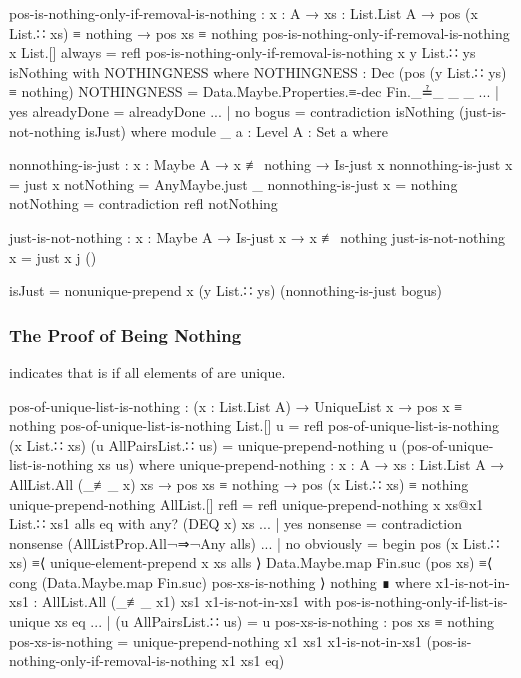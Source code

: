 \documentclass{report}
\begin{document}
\begin{code}
    pos-is-nothing-only-if-removal-is-nothing :
      {x : A} →
      {xs : List.List A} →
      pos (x List.∷ xs) ≡ nothing →
      pos xs ≡ nothing
    pos-is-nothing-only-if-removal-is-nothing {x} {List.[]} always = refl
    pos-is-nothing-only-if-removal-is-nothing {x} {y List.∷ ys} isNothing with NOTHINGNESS
      where
      NOTHINGNESS : Dec (pos (y List.∷ ys) ≡ nothing)
      NOTHINGNESS = Data.Maybe.Properties.≡-dec Fin._≟_ _ _
    ... | yes alreadyDone = alreadyDone
    ... | no bogus = contradiction isNothing (just-is-not-nothing isJust)
      where
      module _
        {a : Level}
        {A : Set a} where

        nonnothing-is-just : {x : Maybe A} → x ≢ nothing → Is-just x
        nonnothing-is-just {x = just x} notNothing = AnyMaybe.just _
        nonnothing-is-just {x = nothing} notNothing = contradiction refl notNothing

        just-is-not-nothing : {x : Maybe A} → Is-just x → x ≢ nothing
        just-is-not-nothing {x = just x} j ()

      isJust = nonunique-prepend x (y List.∷ ys) (nonnothing-is-just bogus)
\end{code}

\subsubsection{The Proof of Being Nothing}
 indicates that   is  if all elements of  are unique.

\begin{code}
    pos-of-unique-list-is-nothing :
      (x : List.List A) →
      UniqueList x →
      pos x ≡ nothing
    pos-of-unique-list-is-nothing List.[] u = refl
    pos-of-unique-list-is-nothing (x List.∷ xs) (u AllPairsList.∷ us) =
      unique-prepend-nothing u (pos-of-unique-list-is-nothing xs us)
      where
      unique-prepend-nothing :
        {x : A} →
        {xs : List.List A} →
        AllList.All (_≢_ x) xs →
        pos xs ≡ nothing →
        pos (x List.∷ xs) ≡ nothing
      unique-prepend-nothing AllList.[] refl = refl
      unique-prepend-nothing {x} xs@{x1 List.∷ xs1} alls eq with any? (DEQ x) xs
      ... | yes nonsense = contradiction nonsense (AllListProp.All¬⇒¬Any alls)
      ... | no obviously = begin
        pos (x List.∷ xs)
          ≡⟨ unique-element-prepend x xs alls ⟩
        Data.Maybe.map Fin.suc (pos xs)
          ≡⟨ cong (Data.Maybe.map Fin.suc) pos-xs-is-nothing ⟩
        nothing ∎
        where
        x1-is-not-in-xs1 : AllList.All (_≢_ x1) xs1
        x1-is-not-in-xs1 with pos-is-nothing-only-if-list-is-unique xs eq
        ... | (u AllPairsList.∷ us) = u
        pos-xs-is-nothing : pos xs ≡ nothing
        pos-xs-is-nothing =
          unique-prepend-nothing {x1} {xs1}
                                 x1-is-not-in-xs1
                                 (pos-is-nothing-only-if-removal-is-nothing {x1} {xs1} eq)
\end{code}
\end{document}
